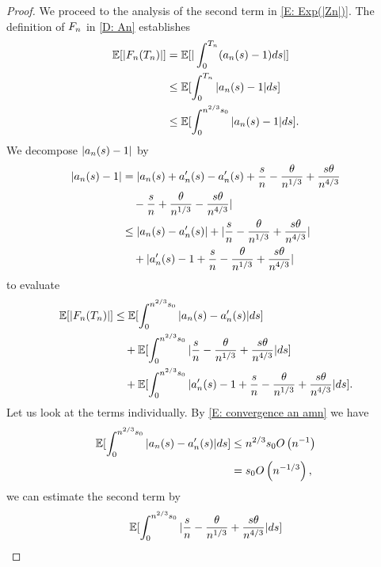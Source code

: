 \begin{proof}
	We proceed to the analysis of the second term in \eqref{E: Exp(|Zn|)}.
	The definition of $F_n$ in \eqref{D: An} establishes
	\begin{equation}
	\begin{aligned}
	\mathbb{E}[|F_n(T_n)|] 
	&= \mathbb{E}[|\int_{0}^{T_n}(a_n(s) -1)ds |] \\
	&\leq \mathbb{E}[\int_{0}^{T_n} |a_n(s)-1|ds] \\
	&\leq \mathbb{E}[\int_{0}^{n^{2 / 3}s_0} |a_n(s)-1|ds].
	\end{aligned}
	\end{equation}
	We decompose $|a_n(s) - 1|$ by
	\begin{equation}
	\begin{aligned}
	|a_n(s)-1| 
	&= | a_n(s) + a'_n(s) - a'_n(s) + \frac{s}{n} - \frac{\theta}{n^{1 / 3}} + \frac{s\theta}{n^{4 / 3}} \\
	&\quad	- \frac{s}{n} + \frac{\theta}{n^{1 / 3}} - \frac{s\theta}{n^{4 / 3}} | \\
	&\leq |a_n(s) - a'_n(s)| + 	|\frac{s}{n} - \frac{\theta}{n^{1 / 3}} + \frac{s\theta}{n^{4 / 3}}| \\
	&\quad    + |a'_n(s) - 1 + \frac{s}{n} - \frac{\theta}{n^{1 / 3}} + \frac{s\theta}{n^{4 / 3}}|
	\end{aligned}
	\end{equation}
	to evaluate
	\begin{equation}
	\begin{aligned}
	\mathbb{E}[|F_n(T_n)|] 
	&\leq \mathbb{E}[\int_{0}^{n^{2 / 3}s_0} |a_n(s) - a'_n(s)|ds] \\
	&\quad + \mathbb{E}[\int_{0}^{n^{2 / 3}s_0} |\frac{s}{n} - \frac{\theta}{n^{1 / 3}} + \frac{s\theta}{n^{4 / 3}}| ds] \\
	&\quad + \mathbb{E}[\int_{0}^{n^{2 / 3}s_0} |a'_n(s) - 1 + \frac{s}{n} - \frac{\theta}{n^{1 / 3}} + \frac{s\theta}{n^{4 / 3}}|ds].
	\end{aligned}
	\end{equation}
	Let us look at the terms individually. 
	By \eqref{E: convergence an amn} we have
	\begin{equation}
	\begin{aligned}
	\mathbb{E}[\int_{0}^{n^{2 / 3}s_0} |a_n(s) - a'_n(s)|ds] 
	&\leq n^{2 / 3}s_0 O\left(n^{-1}\right) \\
	&= s_0 O\left(n^{-1 / 3}\right),
	\end{aligned}
	\end{equation}
	we can estimate the second term by
	\begin{equation}
	\begin{aligned}
	\Exp{\int_{0}^{\n{2}{3}s_0} |\frac{s}{n} - \frac{\pp}{\n{1}{3}} + \frac{s\pp}{\n{4}{3}}| ds}

\end{aligned}
\end{equation}
\end{proof}
